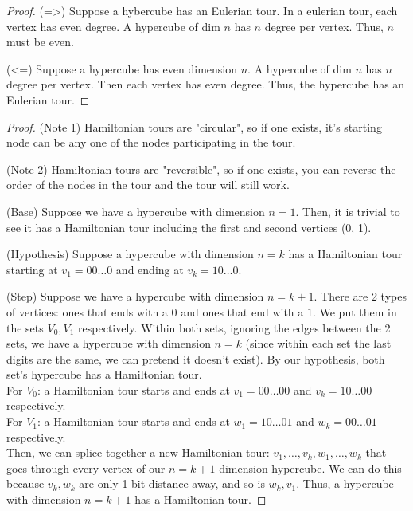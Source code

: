 \documentclass[11pt]{article}
\begin{document}
\begin{solution}
\begin{Parts}
\Part \begin{proof}(=>) Suppose a hybercube has an Eulerian tour.
In a eulerian tour, each vertex has even degree.
A hypercube of dim $n$ has $n$ degree per vertex.
Thus, $n$ must be even.

(<=) Suppose a hypercube has even dimension $n$.
A hypercube of dim $n$ has $n$ degree per vertex.
Then each vertex has even degree.
Thus, the hypercube has an Eulerian tour.
\end{proof}

\Part \begin{proof}
(Note 1) Hamiltonian tours are "circular", so if one exists, it's starting node can be any one of the nodes participating in the tour.

(Note 2) Hamiltonian tours are "reversible", so if one exists, you can reverse the order of the nodes in the tour and the tour will still work.

(Base) Suppose we have a hypercube with dimension $n=1$.
Then, it is trivial to see it has a Hamiltonian tour including the first and second vertices (0, 1).

(Hypothesis) Suppose a hypercube with dimension $n=k$ has a Hamiltonian tour starting at $v_1=00\dots0$ and ending at $v_k=10\dots0$.

(Step) Suppose we have a hypercube with dimension $n=k+1$.
There are 2 types of vertices: ones that ends with a $0$ and ones that end with a $1$. 
We put them in the sets $V_0,V_1$ respectively.
Within both sets, ignoring the edges between the 2 sets, we have a hypercube with dimension $n=k$ (since within each set the last digits are the same, we can pretend it doesn't exist).
By our hypothesis, both set's hypercube has a Hamiltonian tour. 
\\For $V_0$: a Hamiltonian tour starts and ends at $v_1=00\dots00$ and $v_k=10\dots00$ respectively.
\\For $V_1$: a Hamiltonian tour starts and ends at $w_1=10\dots01$ and $w_k=00\dots01$ respectively.
\\Then, we can splice together a new Hamiltonian tour: $v_1,\dots,v_k,w_1,\dots,w_k$ that goes through every vertex of our $n=k+1$ dimension hypercube.
We can do this because $v_k,w_k$ are only 1 bit distance away, and so is $w_k,v_1$.
Thus, a hypercube with dimension $n=k+1$ has a Hamiltonian tour.
\end{proof}\end{Parts}\end{solution}\newpage
\end{document}

